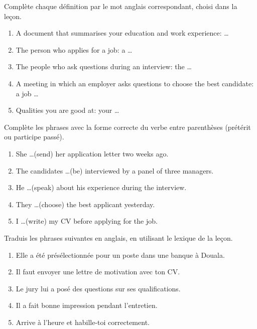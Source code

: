 \documentclass[11pt]{article}
\newcounter{popsec}
\newcounter{popsub}
\newcommand{\courssub}[1]{%
  \stepcounter{popsub}%
  \par\vspace{9pt}\noindent{\popxbold\fontsize{11.5}{13}\selectfont\color{popink}{\color{poporange}\thepopsec.\thepopsub}\hspace{6pt}#1}\par\nopagebreak\vspace{4pt}
}
\begin{document}
\begin{exercice}
Complète chaque définition par le mot anglais correspondant, choisi dans la leçon.
\begin{enumerate}
\item A document that summarises your education and work experience: \dots
\item The person who applies for a job: a \dots
\item The people who ask questions during an interview: the \dots
\item A meeting in which an employer asks questions to choose the best candidate: a job \dots
\item Qualities you are good at: your \dots
\end{enumerate}
\end{exercice}

\begin{exercice}
Complète les phrases avec la forme correcte du verbe entre parenthèses (prétérit ou participe passé).
\begin{enumerate}
\item She \dots (send) her application letter two weeks ago.
\item The candidates \dots (be) interviewed by a panel of three managers.
\item He \dots (speak) about his experience during the interview.
\item They \dots (choose) the best applicant yesterday.
\item I \dots (write) my CV before applying for the job.
\end{enumerate}
\end{exercice}

\courssub{Je m'entraîne}

\begin{exercice}[Traduction]
Traduis les phrases suivantes en anglais, en utilisant le lexique de la leçon.
\begin{enumerate}
\item Elle a été présélectionnée pour un poste dans une banque à Douala.
\item Il faut envoyer une lettre de motivation avec ton CV.
\item Le jury lui a posé des questions sur ses qualifications.
\item Il a fait bonne impression pendant l'entretien.
\item Arrive à l'heure et habille-toi correctement.
\end{enumerate}
\end{exercice}
\end{document}
